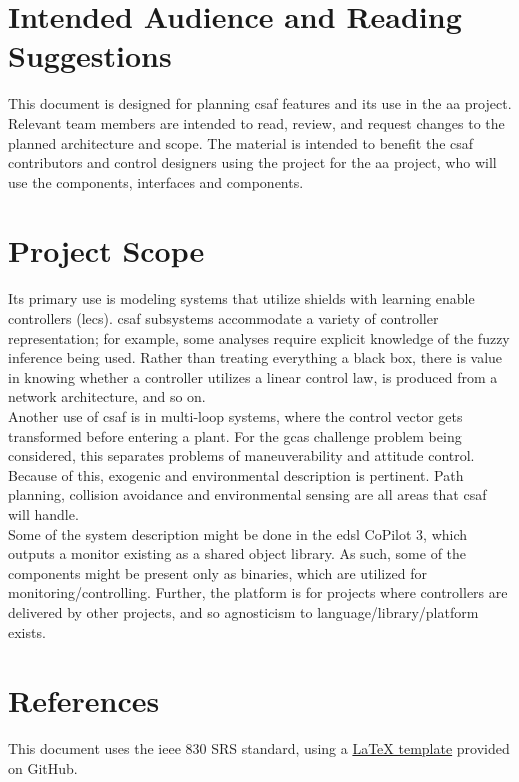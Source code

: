 \section{Intended Audience and Reading Suggestions}

This document is designed for planning \acrshort{csaf} features and its use in the \acrlong{aa} project. 
Relevant team members are intended to read, review, and request changes to the planned architecture and 
scope. The material is intended to benefit the \acrshort{csaf} contributors and control designers using the 
project for the \acrlong{aa} project, who will use the components, interfaces and components.\\

\section{Project Scope}
Its primary use is modeling systems that utilize shields with learning enable controllers (\acrshort{lec}s). 
\acrshort{csaf} subsystems accommodate a variety of controller representation; for example, some analyses 
require explicit knowledge of the fuzzy inference being used. Rather than treating everything a black box, 
there is value in knowing whether a controller utilizes a linear control law, is produced from a network 
architecture, and so on.\\

Another use of \acrshort{csaf} is in multi-loop systems, where the control vector gets transformed before 
entering a plant. For the \acrlong{gcas} challenge problem being considered, this separates problems of 
maneuverability and attitude control. Because of this, exogenic and environmental description is pertinent. 
Path planning, collision avoidance and environmental sensing are all areas that \acrshort{csaf} will handle.\\

Some of the system description might be done in the \acrshort{edsl} CoPilot 3, which outputs a monitor 
existing as a shared object library. As such, some of the components might be present only as binaries, which 
are utilized for monitoring/controlling. Further, the platform is for projects where controllers are 
delivered by other projects, and so agnosticism to language/library/platform exists. 

\section{References}

This document uses the \acrshort{ieee} 830 SRS standard, using a \href{https://github.com/jpeisenbarth/SRS-Tex}{\LaTeX{} template} provided on GitHub.  \\
